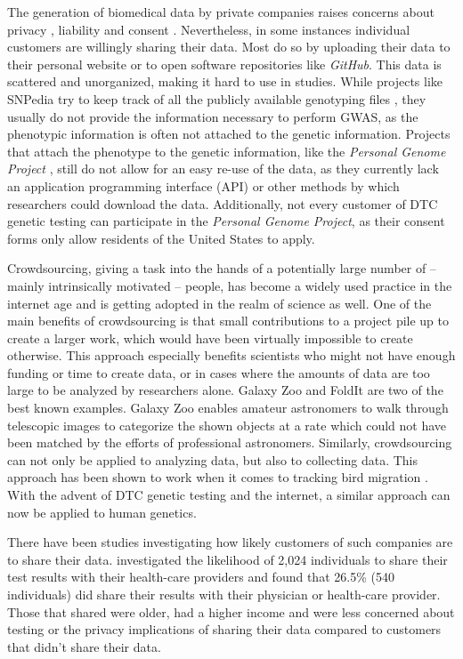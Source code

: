 \documentclass[10pt]{article}
\begin{document}
The generation of biomedical data by private companies raises concerns about privacy \cite{23andMe2012}, 
liability and consent \cite{Caulfield2011}. 
Nevertheless, in some instances individual customers are willingly sharing their data. Most do so by uploading their data to
their personal website or to open software repositories like \textit{GitHub}. 
This data is scattered and unorganized, making it hard to use in studies. While projects like SNPedia try to keep track of all 
the publicly available genotyping files \cite{Cariaso2011}, they usually do not provide the information necessary to perform GWAS, as the phenotypic information is 
often not attached to the genetic information. Projects that attach the phenotype to the genetic information, 
like the \textit{Personal Genome Project} \cite{Ball24072012}, still do not allow for an easy re-use of the data, as they currently lack an application programming interface (API) 
or other methods by which researchers could download the data. Additionally, not every customer of DTC genetic testing can participate in the \textit{Personal Genome Project}, as their consent forms only allow residents of the United States to apply.  

Crowdsourcing, giving a task into the hands of a potentially large number of -- mainly intrinsically motivated -- people, has become a widely used practice in the internet age and is getting adopted in the realm of science as well. One of the main benefits of crowdsourcing is that small contributions to a project pile up to create a larger work, which would have been virtually impossible to create otherwise. This approach especially benefits scientists who might not have enough funding or time to create data, or in cases where the amounts of data are too large to be analyzed by researchers alone.
 Galaxy Zoo and FoldIt \cite{Eiben2012, GalaxyZoo} are two of the best known examples. 
Galaxy Zoo enables amateur astronomers to walk through telescopic images to categorize the shown objects at a rate which could not have been matched by the efforts of professional astronomers.
Similarly, crowdsourcing can not only be applied to analyzing data, but also to collecting data. This approach has been shown to work when it comes to tracking bird migration \cite{CrowdsourcingReview2010}. With the advent of DTC genetic testing and the internet, a similar approach can now be applied to human genetics.

There have been studies investigating how likely customers of such companies are to share their data. \cite{Darst2013} investigated the likelihood of 2,024 individuals to share their test results with their health-care providers and found that 26.5\% (540 individuals) did share their results with their physician or health-care provider. Those that shared were older, had a higher income and were less concerned about testing or the privacy implications of sharing their data compared to customers that didn't share their data.
\end{document}
